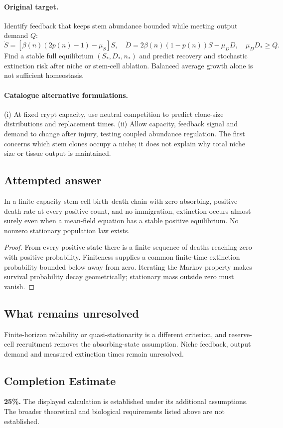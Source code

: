 \documentclass[11pt]{article}
\begin{document}
\paragraph{Original target.}
Identify feedback that keeps stem abundance bounded while meeting output demand $Q$:
\[
\dot S=[\beta(n)(2p(n)-1)-\mu_S]S,\quad
\dot D=2\beta(n)(1-p(n))S-\mu_DD,
\quad\mu_DD_*\geq Q.
\]
Find a stable full equilibrium $(S_*,D_*,n_*)$ and predict recovery and stochastic extinction risk after niche or stem-cell ablation. Balanced average growth alone is not sufficient homeostasis.
\paragraph{Catalogue alternative formulations.}
(i) At fixed crypt capacity, use neutral competition to predict clone-size distributions and replacement times. (ii) Allow capacity, feedback signal and demand to change after injury, testing coupled abundance regulation. The first concerns which stem clones occupy a niche; it does not explain why total niche size or tissue output is maintained.
\subsection{Attempted answer}
\begin{proposition}
In a finite-capacity stem-cell birth--death chain with zero absorbing, positive death rate at every positive count, and no immigration, extinction occurs almost surely even when a mean-field equation has a stable positive equilibrium. No nonzero stationary population law exists.
\end{proposition}
\begin{proof}
From every positive state there is a finite sequence of deaths reaching zero with positive probability. Finiteness supplies a common finite-time extinction probability bounded below away from zero. Iterating the Markov property makes survival probability decay geometrically; stationary mass outside zero must vanish.
\end{proof}
\subsection{What remains unresolved}
Finite-horizon reliability or quasi-stationarity is a different criterion, and reserve-cell recruitment removes the absorbing-state assumption. Niche feedback, output demand and measured extinction times remain unresolved.
\subsection{Completion Estimate}
\textbf{25\%.} The displayed calculation is established under its additional assumptions. The broader theoretical and biological requirements listed above are not established.
\end{document}

